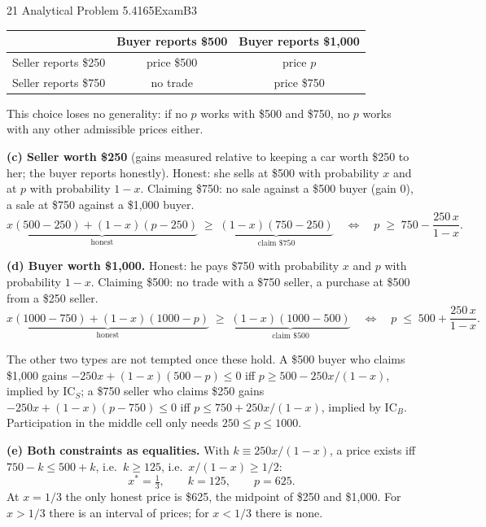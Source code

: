 \begin{exsol}{21}{\MR{} Analytical Problem 5.4}{165}{Exam}{B3}
\begin{center}
\begin{tabular}{lcc}
\toprule
 & Buyer reports \$500 & Buyer reports \$1{,}000 \\
\midrule
Seller reports \$250 & price \$500 & price $p$ \\
Seller reports \$750 & no trade & price \$750 \\
\bottomrule
\end{tabular}
\end{center}

This choice loses no generality: if no $p$ works with \$500 and \$750, no $p$ works with any
other admissible prices either.

\textbf{(c) Seller worth \$250} (gains measured relative to keeping a car worth \$250 to her;
the buyer reports honestly). Honest: she sells at \$500 with probability $x$ and at $p$ with
probability $1-x$. Claiming \$750: no sale against a \$500 buyer (gain 0), a sale at \$750
against a \$1{,}000 buyer.
\[
  \underbrace{x(500-250) + (1-x)(p-250)}_{\text{honest}} \;\ge\;
  \underbrace{(1-x)(750-250)}_{\text{claim \$750}}
  \quad\Longleftrightarrow\quad
  p \;\ge\; 750 - \frac{250\,x}{1-x}. \tag{IC$_S$}
\]

\textbf{(d) Buyer worth \$1{,}000.} Honest: he pays \$750 with probability $x$ and $p$ with
probability $1-x$. Claiming \$500: no trade with a \$750 seller, a purchase at \$500 from a
\$250 seller.
\[
  \underbrace{x(1000-750) + (1-x)(1000-p)}_{\text{honest}} \;\ge\;
  \underbrace{(1-x)(1000-500)}_{\text{claim \$500}}
  \quad\Longleftrightarrow\quad
  p \;\le\; 500 + \frac{250\,x}{1-x}. \tag{IC$_B$}
\]

The other two types are not tempted once these hold. A \$500 buyer who claims \$1{,}000 gains
$-250x + (1-x)(500-p) \le 0$ iff $p \ge 500 - 250x/(1-x)$, implied by IC$_S$; a \$750 seller who
claims \$250 gains $-250x + (1-x)(p-750) \le 0$ iff $p \le 750 + 250x/(1-x)$, implied by IC$_B$.
Participation in the middle cell only needs $250 \le p \le 1000$.

\textbf{(e) Both constraints as equalities.} With $k \equiv 250x/(1-x)$, a price exists iff
$750 - k \le 500 + k$, i.e.\ $k \ge 125$, i.e.\ $x/(1-x) \ge 1/2$:
\[
  \boxed{x^* = \tfrac{1}{3}}, \qquad k = 125, \qquad p = 625 .
\]
At $x = 1/3$ the only honest price is \$625, the midpoint of \$250 and \$1{,}000. For $x > 1/3$
there is an interval of prices; for $x < 1/3$ there is none.


\end{exsol}
